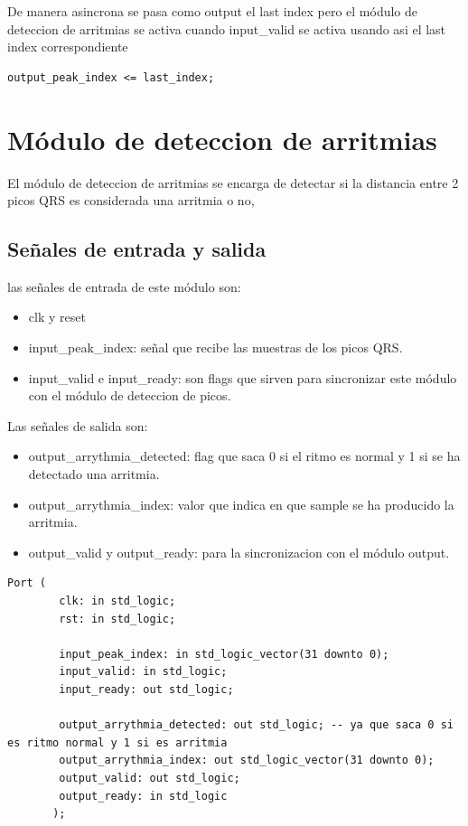 De manera asincrona se pasa como output el last index pero el módulo de deteccion de arritmias se activa cuando input\_valid
se activa usando asi el last index correspondiente 
\lstset{language=VHDL, breaklines=true, basicstyle=\footnotesize}
\begin{lstlisting}[frame=single]
    output_peak_index <= last_index;
\end{lstlisting}

\section{Módulo de deteccion de arritmias}

El módulo de deteccion de arritmias se encarga de detectar si la distancia entre 2 picos QRS es considerada una arritmia o no,
 
\subsection{Señales de entrada y salida}
las señales de entrada de este módulo son:

\begin{itemize}
    \item clk y reset
    \item input\_peak\_index: señal que recibe las muestras de los picos QRS.
    \item input\_valid e input\_ready: son flags que sirven para sincronizar este módulo con el módulo de deteccion de picos. 
\end{itemize}
    
Las señales de salida son:

\begin{itemize}
    \item output\_arrythmia\_detected: flag que saca 0 si el ritmo es normal y 1 si se ha detectado una arritmia.
    \item output\_arrythmia\_index: valor que indica en que sample se ha producido la arritmia.
    \item output\_valid y output\_ready: para la sincronizacion con el módulo output.
\end{itemize}

\lstset{language=VHDL, breaklines=true, basicstyle=\footnotesize}
\begin{lstlisting}[frame=single]
    Port (
        clk: in std_logic;
        rst: in std_logic;
        
        input_peak_index: in std_logic_vector(31 downto 0); 
        input_valid: in std_logic;
        input_ready: out std_logic;
        
        output_arrythmia_detected: out std_logic; -- ya que saca 0 si es ritmo normal y 1 si es arritmia
        output_arrythmia_index: out std_logic_vector(31 downto 0);
        output_valid: out std_logic;
        output_ready: in std_logic
       );
\end{lstlisting}

